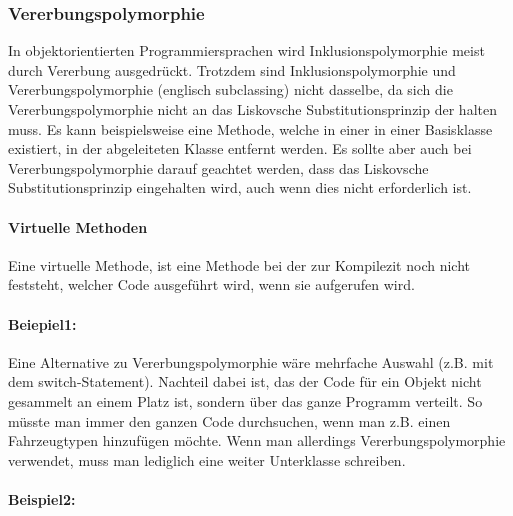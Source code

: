 		\subsubsection{Vererbungspolymorphie}
			In objektorientierten Programmiersprachen wird Inklusionspolymorphie meist durch Vererbung ausgedrückt.
			Trotzdem sind Inklusionspolymorphie und Vererbungspolymorphie (englisch subclassing) nicht dasselbe, da sich
			die Vererbungspolymorphie nicht an das Liskovsche Substitutionsprinzip der halten muss. Es kann beispielsweise
			eine Methode, welche in einer in einer Basisklasse existiert, in der abgeleiteten Klasse entfernt werden. Es
			sollte aber auch bei Vererbungspolymorphie darauf geachtet werden, dass das Liskovsche Substitutionsprinzip
			eingehalten wird, auch wenn dies nicht erforderlich ist.
			
			\paragraph{Virtuelle Methoden}
				Eine virtuelle Methode, ist eine Methode bei der zur Kompilezit noch nicht feststeht, welcher Code ausgeführt
				wird, wenn sie aufgerufen wird.
			
			\paragraph*{Beiepiel1:}\mbox{}
			
				\UseRawInputEncoding{}
				Eine Alternative zu Vererbungspolymorphie wäre mehrfache Auswahl (z.B. mit dem switch-Statement). Nachteil dabei
				ist, das der Code für ein Objekt nicht gesammelt an einem Platz ist, sondern über das ganze Programm verteilt.
				So müsste man immer den ganzen Code durchsuchen, wenn man z.B. einen Fahrzeugtypen hinzufügen möchte. Wenn man
				allerdings Vererbungspolymorphie verwendet, muss man lediglich eine weiter Unterklasse schreiben.
				
				\UseRawInputEncoding{}
				
			
			\paragraph*{Beispiel2:}\mbox{}
			
